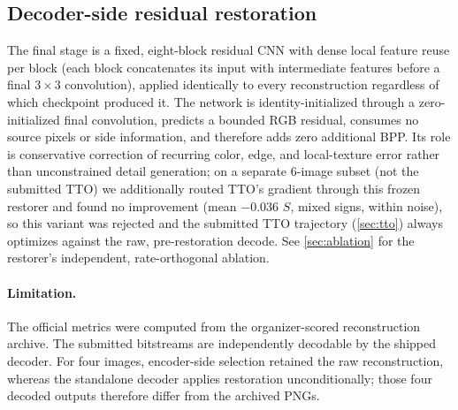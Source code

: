 \documentclass[runningheads]{llncs}
\begin{document}
\subsection{Decoder-side residual restoration}
\label{sec:restorer}
The final stage is a fixed, eight-block residual CNN with dense local feature reuse per block (each block concatenates its input with intermediate features before a final $3\times3$ convolution), applied identically to every reconstruction regardless of which checkpoint produced it. The network is identity-initialized through a zero-initialized final convolution, predicts a bounded RGB residual, consumes no source pixels or side information, and therefore adds zero additional BPP. Its role is conservative correction of recurring color, edge, and local-texture error rather than unconstrained detail generation; on a separate 6-image subset (not the submitted TTO) we additionally routed TTO's gradient through this frozen restorer and found no improvement (mean $-0.036$ $S$, mixed signs, within noise), so this variant was rejected and the submitted TTO trajectory (\cref{sec:tto}) always optimizes against the raw, pre-restoration decode. See \cref{sec:ablation} for the restorer's independent, rate-orthogonal ablation.

\paragraph{Limitation.} The official metrics were computed from the organizer-scored reconstruction archive. The submitted bitstreams are independently decodable by the shipped decoder. For four images, encoder-side selection retained the raw reconstruction, whereas the standalone decoder applies restoration unconditionally; those four decoded outputs therefore differ from the archived PNGs.
\end{document}
